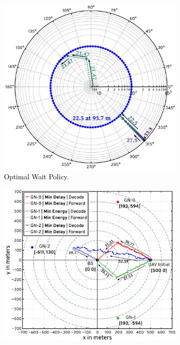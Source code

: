 \documentclass[12pt, draftcls, onecolumn]{IEEEtran}
\theoremstyle{plain}
\theoremstyle{definition}
\theoremstyle{remark}
\newcommand\hlt[1]{\textcolor{black}{#1}}
\begin{document}
\begin{figure} [t]
    \begin{subfigure}{0.485\linewidth}
      \centering
      \includegraphics[width=1.0\linewidth]{figs/Waiting_Policy_10Mb.jpeg}
      \caption{\hlt{Optimal Wait Policy.}}
      \label{F6}
    \end{subfigure}
    \hfill
    \begin{subfigure}{0.515\linewidth}
      \centering
      \includegraphics[width=1.0\linewidth]{figs/HCSO_Trajectories_Updated.jpeg}

\end{subfigure}
\end{figure}
\end{document}
